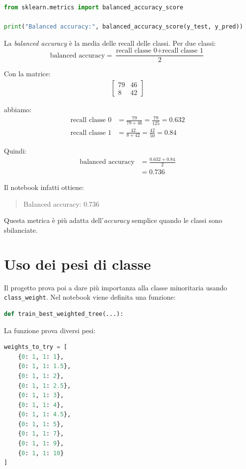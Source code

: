 \documentclass[11pt,a4paper]{article}
\begin{document}
\begin{lstlisting}[language=Python]
from sklearn.metrics import balanced_accuracy_score

print("Balanced accuracy:", balanced_accuracy_score(y_test, y_pred))
\end{lstlisting}

La \textit{balanced accuracy} è la media delle recall delle classi. Per due classi:
\begin{equation}
    \text{balanced accuracy} = \frac{\text{recall classe 0} + \text{recall classe 1}}{2}
\end{equation}

Con la matrice:
\begin{align*}
    \begin{bmatrix}
        79 & 46 \\
        8 & 42
    \end{bmatrix}
\end{align*}

abbiamo:
\begin{align*}
    \text{recall classe 0} &= \frac{79}{79 + 46} = \frac{79}{125} = 0.632 \\
    \text{recall classe 1} &= \frac{42}{8 + 42} = \frac{42}{50} = 0.84
\end{align*}

Quindi:
\begin{align*}
    \text{balanced accuracy} &= \frac{0.632 + 0.84}{2} \\
                              &= 0.736
\end{align*}

Il notebook infatti ottiene:
\begin{quote}
    Balanced accuracy: 0.736
\end{quote}

Questa metrica è più adatta dell'\textit{accuracy} semplice quando le classi sono sbilanciate.

\section{Uso dei pesi di classe}
Il progetto prova poi a dare più importanza alla classe minoritaria usando \texttt{class\_weight}. Nel notebook viene definita una funzione:

\begin{lstlisting}[language=Python]
def train_best_weighted_tree(...):
\end{lstlisting}

La funzione prova diversi pesi:
\begin{lstlisting}[language=Python]
weights_to_try = [
    {0: 1, 1: 1},
    {0: 1, 1: 1.5},
    {0: 1, 1: 2},
    {0: 1, 1: 2.5},
    {0: 1, 1: 3},
    {0: 1, 1: 4},
    {0: 1, 1: 4.5},
    {0: 1, 1: 5},
    {0: 1, 1: 7},
    {0: 1, 1: 9},
    {0: 1, 1: 10}
]
\end{lstlisting}
\end{document}
